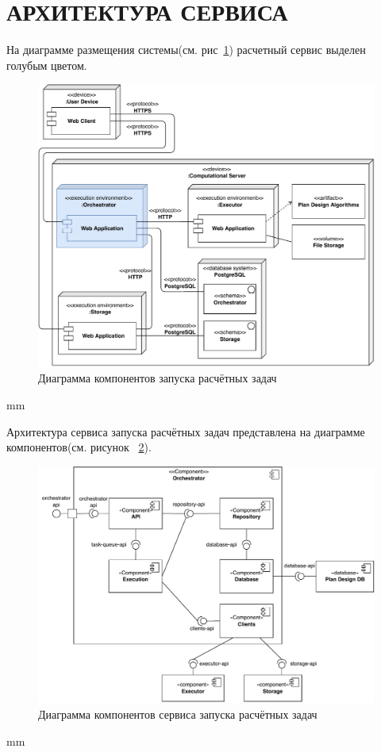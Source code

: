 \section*{\Large{АРХИТЕКТУРА СЕРВИСА}}

На диаграмме размещения системы(см. рис\ \ref{pic:architecture__deployment-diagram})
расчетный сервис выделен голубым цветом.

\begin{figure}[H]
	\includegraphics[width=\textwidth]{pictures/deployment}
	\caption{Диаграмма компонентов запуска расчётных задач}
	\label{pic:architecture__deployment-diagram}
\end{figure}
 mm


Архитектура сервиса запуска расчётных задач представлена на диаграмме
компонентов(см. рисунок \ \ref{pic:architecture__orchestrator-component}).

\begin{figure}[H]
	\includegraphics[width=\textwidth]{pictures/component_common}
	\caption{Диаграмма компонентов сервиса запуска расчётных задач}
	\label{pic:architecture__orchestrator-component}
\end{figure}
 mm

